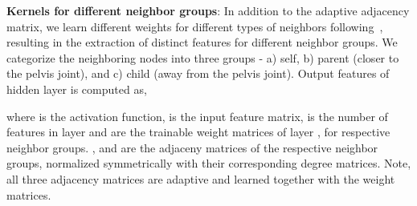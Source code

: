 \documentclass{article}
\begin{document}
\textbf{Kernels for different neighbor groups}: In addition to the adaptive adjacency matrix, we learn different weights for different types of neighbors following~\cite{Cai2019}, resulting in the extraction of distinct features for different neighbor groups.
We categorize the neighboring nodes into three groups - a) self, b) parent (closer to the pelvis joint), and c) child (away from the pelvis joint). 
Output features of hidden layer  is computed as,

where  is the activation function,  is the input feature matrix,  is the number of features in layer  and  are the trainable weight matrices of layer , for respective neighbor groups.
,  and  are the adjaceny matrices of the respective neighbor groups, normalized symmetrically with their corresponding degree matrices.
Note, all three adjacency matrices are adaptive and learned together with the weight matrices. 

\begin{table*}[t]
\centering
{}
\caption{\label{tab:mpjpe-joint}Mean Per Joint Position Error (MPJPE) (Protocol \#1) in millimeter between predicted and ground-truth poses on Human 3.~6m Dataset at joint level, in increasing order. The last column reports the average error. }
\end{table*}
\end{document}
